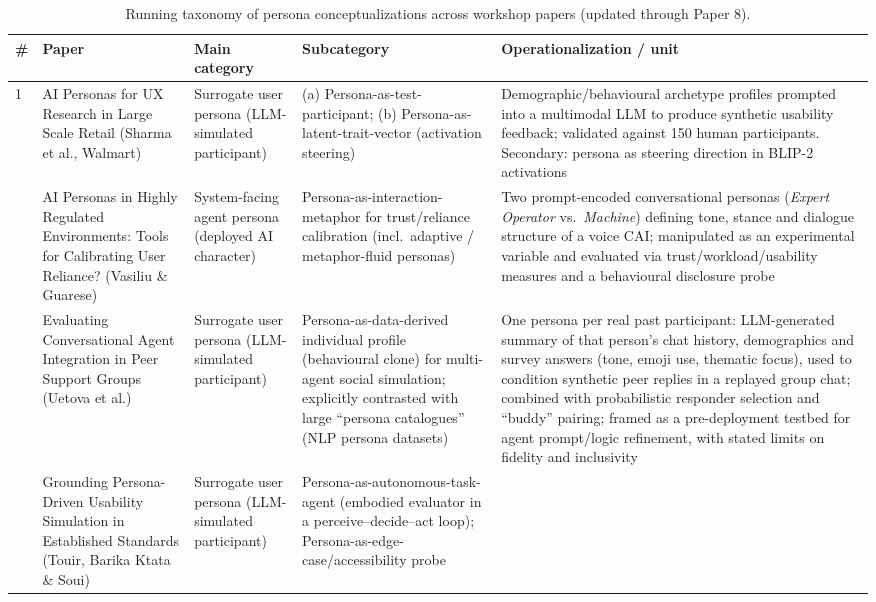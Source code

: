 \begin{table}[t]
\centering
\caption{Running taxonomy of persona conceptualizations across workshop papers (updated through Paper 8).}
\label{tab:persona-taxonomy}
\small
\begin{tabular}{p{0.5cm} p{3.6cm} p{3.4cm} p{3.6cm} p{3.6cm}}
\toprule
\textbf{\#} & \textbf{Paper} & \textbf{Main category} & \textbf{Subcategory} & \textbf{Operationalization / unit} \\
\midrule
1 & AI Personas for UX Research in Large Scale Retail (Sharma et al., Walmart) &
Surrogate user persona (LLM-simulated participant) &
(a) Persona-as-test-participant; (b) Persona-as-latent-trait-vector (activation steering) &
Demographic/behavioural archetype profiles prompted into a multimodal LLM to produce synthetic usability feedback; validated against 150 human participants. Secondary: persona as steering direction in BLIP-2 activations \\
\addlinespace
2 & AI Personas in Highly Regulated Environments: Tools for Calibrating User Reliance? (Vasiliu \& Guarese) &
System-facing agent persona (deployed AI character) &
Persona-as-interaction-metaphor for trust/reliance calibration (incl.\ adaptive / metaphor-fluid personas) &
Two prompt-encoded conversational personas (\textit{Expert Operator} vs.\ \textit{Machine}) defining tone, stance and dialogue structure of a voice CAI; manipulated as an experimental variable and evaluated via trust/workload/usability measures and a behavioural disclosure probe \\
\addlinespace
3 & Evaluating Conversational Agent Integration in Peer Support Groups (Uetova et al.) &
Surrogate user persona (LLM-simulated participant) &
Persona-as-data-derived individual profile (behavioural clone) for multi-agent social simulation; explicitly contrasted with large ``persona catalogues'' (NLP persona datasets) &
One persona per real past participant: LLM-generated summary of that person's chat history, demographics and survey answers (tone, emoji use, thematic focus), used to condition synthetic peer replies in a replayed group chat; combined with probabilistic responder selection and ``buddy'' pairing; framed as a pre-deployment testbed for agent prompt/logic refinement, with stated limits on fidelity and inclusivity \\
\addlinespace
4 & Grounding Persona-Driven Usability Simulation in Established Standards (Touir, Barika Ktata \& Soui) &
Surrogate user persona (LLM-simulated participant) &
Persona-as-autonomous-task-agent (embodied evaluator in a perceive--decide--act loop); Persona-as-edge-case/accessibility probe &

\end{tabular}
\end{table}

